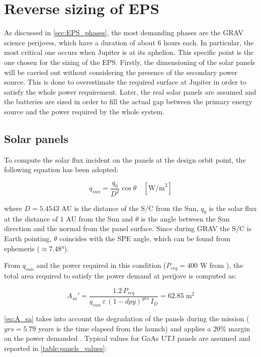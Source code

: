 \section{Reverse sizing of EPS}
\label{sec:EPS_sizing}

As discussed in \autoref{sec:EPS_phases}, the most demanding phases are the GRAV science perijoves, which have a duration of about 6 hours each. In particular, the most critical one occurs when Jupiter is at its aphelion.
This specific point is the one chosen for the sizing of the EPS.
Firstly, the dimensioning of the solar panels will be carried out without considering the presence of the secondary power source.
This is done to overestimate the required surface at Jupiter in order to satisfy the whole power requirement.
Later, the real solar panels are assumed and the batteries are sized in order to fill the actual gap between the primary energy source and the power required by the whole system. 


\subsection{Solar panels}
\label{subsec:solar_panels_sizing}

To compute the solar flux incident on the panels at the design orbit point, the following equation has been adopted:

\begin{equation}
    q_{sun} = \frac{q_0}{D^2} \cos \theta \quad [ \textrm{W/m}^2 ]
\end{equation}

where $D = 5.4543$ AU is the distance of the S/C from the Sun, $q_0$ is the solar flux at the distance of $1$ AU from the Sun and $\theta$ is the angle between the Sun direction and the normal from the panel surface.
Since during GRAV the S/C is Earth pointing, $\theta$ coincides with the SPE angle, which can be found from ephemeris ($\approx 7.48$°).

From $q_{sun}$ and the power required in this condition ($P_{req} = 400$ W from \mref), the total area required to satisfy the power demand at perijove is computed as:

\begin{equation}
    A_{sa}' = \frac{1.2 \, P_{req}}{q_{sun} \, \varepsilon \, \left( 1 - dpy \right) ^ {yrs} \, I_D} = 62.85 \; \textrm{m}^2
    \label{eq:A_sa}
\end{equation}

\autoref{eq:A_sa} takes into account the degradation of the panels during the mission ($yrs = 5.79$ years is the time elapsed from the launch) and applies a $20\%$ margin on the power demanded \mref.
Typical values for GaAs UTJ panels are assumed and reported in \autoref{table:panels_values}:

